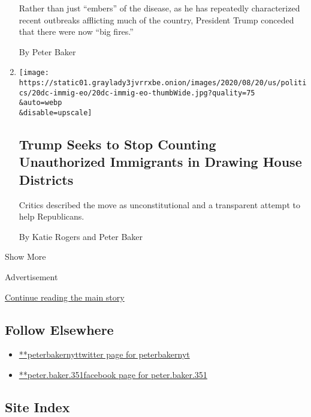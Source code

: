 \begin{enumerate}
  Rather than just ``embers'' of the disease, as he has repeatedly
  characterized recent outbreaks afflicting much of the country,
  President Trump conceded that there were now ``big fires.''

  By Peter Baker
\item
  \href{/2020/07/21/us/politics/trump-immigrants-census-redistricting.html}{}

  \texttt{[image: https://static01.graylady3jvrrxbe.onion/images/2020/08/20/us/politics/20dc-immig-eo/20dc-immig-eo-thumbWide.jpg?quality=75\\\&auto=webp\\\&disable=upscale]}

  \hypertarget{trump-seeks-to-stop-counting-unauthorized-immigrants-in-drawing-house-districts}{%
  \subsection{Trump Seeks to Stop Counting Unauthorized Immigrants in
  Drawing House
  Districts}\label{trump-seeks-to-stop-counting-unauthorized-immigrants-in-drawing-house-districts}}

  Critics described the move as unconstitutional and a transparent
  attempt to help Republicans.

  By Katie Rogers and Peter Baker
\end{enumerate}

Show More

Advertisement

\protect\hyperlink{after-mid2}{Continue reading the main story}

\hypertarget{follow-elsewhere}{%
\subsection{Follow Elsewhere}\label{follow-elsewhere}}

\begin{itemize}
\tightlist
\item
  \href{https://twitter.com/peterbakernyt}{**peterbakernyttwitter page
  for peterbakernyt}
\item
  \href{https://www.facebookcorewwwi.onion/peter.baker.351}{**peter.baker.351facebook
  page for peter.baker.351}
\end{itemize}

\hypertarget{site-index}{%
\subsection{Site Index}\label{site-index}}

